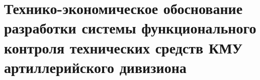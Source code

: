 \newcommand{\byr}{руб}

\section{Технико-экономическое обоснование разработки системы функционального контроля технических средств КМУ
артиллерийского дивизиона}





\FPeval{\leadDevPerHourExact}{\leadDevPerMonth / \normativeManHours}
\FPeval{\devPerHourExact}{\devPerMonth / \normativeManHours}
\FPeval{\qaPerHourExact}{\qaPerMonth / \normativeManHours}


\FPeval{\leadDevSalaryExact}{\leadDevHours * \leadDevPerHourExact}
\FPeval{\devSalaryExact}{\devHours * \devPerHourExact}
\FPeval{\qaSalaryExact}{\qaHours * \qaPerHourExact}












